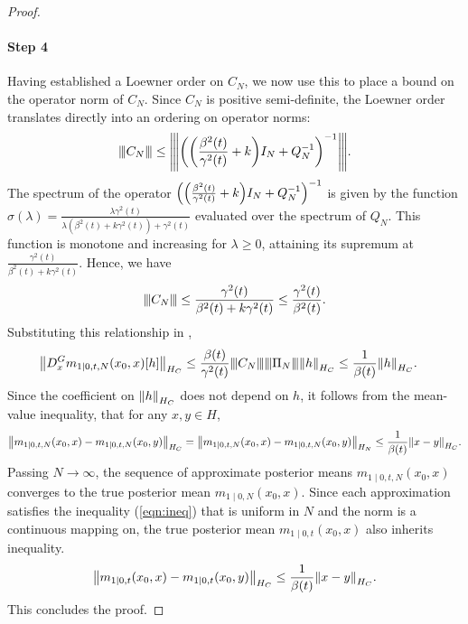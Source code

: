 \begin{proof}
  \paragraph{Step 4} Having established a Loewner order on \(C_{N}\), we now use this to place a bound on the operator norm of \(C_{N}\). Since \(C_{N}\) is positive semi-definite, the Loewner order translates directly into an ordering on operator norms:
  \[
    {\left\vert\kern-0.25ex\left\vert\kern-0.25ex\left\vert C_{N} \right\vert\kern-0.25ex\right\vert\kern-0.25ex\right\vert} \leq {\left\vert\kern-0.25ex\left\vert\kern-0.25ex\left\vert \qty(\qty(\frac{\beta^{2}(t)}{\gamma^{2}(t)} + k) I_{N} + Q_{N}^{-1})^{-1} \right\vert\kern-0.25ex\right\vert\kern-0.25ex\right\vert}.
  \] %
  The spectrum of the operator \(\qty(\qty(\frac{\beta^{2}(t)}{\gamma^{2}(t)} + k) I_{N} + Q_{N}^{-1})^{-1}\) is given by the function \(\sigma(\lambda) = \frac{\lambda \gamma^{2}(t)}{\lambda (\beta^{2}(t) + k \gamma^{2}(t)) + \gamma^{2}(t)}\) evaluated over the spectrum of \(Q_{N}\). This function is monotone and increasing for \(\lambda \geq 0\), attaining its supremum at \(\frac{\gamma^{2}(t)}{\beta^{2}(t) + k \gamma^{2}(t)}\). Hence, we have
  \[
    {\left\vert\kern-0.25ex\left\vert\kern-0.25ex\left\vert C_{N} \right\vert\kern-0.25ex\right\vert\kern-0.25ex\right\vert} \leq \frac{\gamma^{2}(t)}{\beta^{2}(t) + k \gamma^{2}(t)} \leq \frac{\gamma^{2}(t)}{\beta^{2}(t)}.
  \] Substituting this relationship in ,
  \begin{align*}
    \norm{D_{x}^{G} m_{1 \mid 0, t, N}(x_{0}, x)[h]}_{H_{C}} &\leq \frac{\beta(t)}{\gamma^{2}(t)} {\left\vert\kern-0.25ex\left\vert\kern-0.25ex\left\vert C_{N} \right\vert\kern-0.25ex\right\vert\kern-0.25ex\right\vert} {\left\vert\kern-0.25ex\left\vert\kern-0.25ex\left\vert \Pi_{N} \right\vert\kern-0.25ex\right\vert\kern-0.25ex\right\vert} \norm{h}_{H_{C}} \leq \frac{1}{\beta(t)} \norm{h}_{H_{C}}.
  \end{align*}
  Since the coefficient on \(\norm{h}_{H_{C}}\) does not depend on \(h\), it follows from the mean-value inequality, that for any \(x, y \in H\),
  \begin{equation}
    \norm{m_{1 \mid 0, t, N}(x_{0}, x) - m_{1 \mid 0, t, N}(x_{0}, y)}_{H_{C}} = \norm{m_{1 \mid 0, t, N}(x_{0}, x) - m_{1 \mid 0, t, N}(x_{0}, y)}_{H_{N}} \leq \frac{1}{\beta(t)} \norm{x - y}_{H_{C}}. \label{eqn:ineq}
  \end{equation}%
  Passing \(N \to \infty\), the sequence of approximate posterior means \(m_{1 \mid 0, t, N}(x_{0}, x)\) converges to the true posterior mean \(m_{1 \mid 0, N}(x_{0}, x)\). Since each approximation satisfies the inequality (\ref{eqn:ineq}) that is uniform in \(N\) and the norm is a continuous mapping on, the true posterior mean \(m_{1 \mid 0, t}(x_{0}, x)\) also inherits inequality.
  \[
    \norm{m_{1 \mid 0, t}(x_{0}, x) - m_{1 \mid 0, t}(x_{0}, y)}_{H_{C}} \leq \frac{1}{\beta(t)} \norm{x - y}_{H_{C}}.
  \]
  This concludes the proof.%
\end{proof}